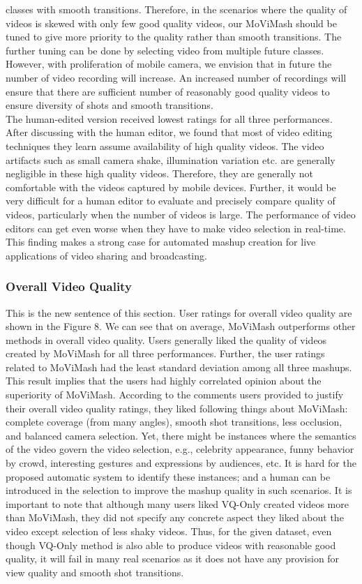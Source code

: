 \documentclass{sig-alternate}
\begin{document}
{{{classes with smooth transitions. Therefore, in the scenarios
where the quality of videos is skewed with only few good quality
videos, our MoViMash should be tuned to give more priority to
the quality rather than smooth transitions. The further tuning can
be done by selecting video from multiple future classes. However,
with proliferation of mobile camera, we envision that in future the
number of video recording will increase. An increased number of
recordings will ensure that there are sufficient number of reasonably
good quality videos to ensure diversity of shots and smooth
transitions.\\
The human-edited version received lowest ratings for all three
performances. After discussing with the human editor, we found
that most of video editing techniques they learn assume availability
of high quality videos. The video artifacts such as small camera 
shake, illumination variation etc. are generally negligible in these
high quality videos. Therefore, they are generally not comfortable
with the videos captured by mobile devices. Further, it would be
very difficult for a human editor to evaluate and precisely compare
quality of videos, particularly when the number of videos is large.
The performance of video editors can get even worse when they
have to make video selection in real-time. This finding makes a
strong case for automated mashup creation for live applications of
video sharing and broadcasting.
\subsubsection{Overall Video Quality}
This is the new sentence of this section.
User ratings for overall video quality are shown in the Figure 8.
We can see that on average, MoViMash outperforms other methods
in overall video quality. Users generally liked the quality of
videos created by MoViMash for all three performances. Further,
the user ratings related to MoViMash had the least standard deviation
among all three mashups. This result implies that the users
had highly correlated opinion about the superiority of MoViMash.
According to the comments users provided to justify their overall
video quality ratings, they liked following things about MoViMash:
complete coverage (from many angles), smooth shot transitions,
less occlusion, and balanced camera selection. Yet, there might
be instances where the semantics of the video govern the video
selection, e.g., celebrity appearance, funny behavior by crowd, interesting
gestures and expressions by audiences, etc. It is hard for
the proposed automatic system to identify these instances; and a
human can be introduced in the selection to improve the mashup
quality in such scenarios.
It is important to note that although many users liked VQ-Only
created videos more than MoViMash, they did not specify any concrete
aspect they liked about the video except selection of less
shaky videos. Thus, for the given dataset, even though VQ-Only
method is also able to produce videos with reasonable good quality,
it will fail in many real scenarios as it does not have any provision
for view quality and smooth shot transitions.

}}}
\end{document}

